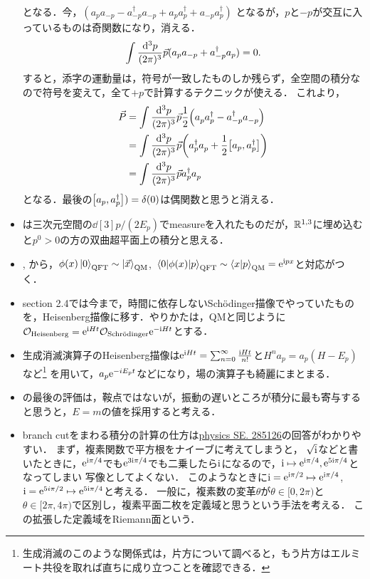 \begin{itemize}
		となる．今，$(a_pa_{-p}-a_{-p}^\dag a_{-p}+a_pa_p^{\dag}+a_{-p}a_{p}^\dag)$
		となるが，$p$と$-p$が交互に入っているものは奇関数になり，消える．		\begin{equation}
			\int \frac{\dd[3]{p}}{(2\pi)^{3}}\vec{p}(a_pa_{-p}+a_{-p}^{\dag}a_{p}) = 0.
		\end{equation}
		すると，添字の運動量は，符号が一致したものしか残らず，全空間の積分なので符号を変えて，全て$+p$で計算するテクニックが使える．
		これより，
		\begin{align}
			\vec{P} &= \int \frac{\dd[3]{p}}{(2\pi)^{3}}\vec{p}\frac{1}{2}\qty(a_p^{}a_p^{\dag}-a_{-p}^\dag a_{-p}^{})\\
					&= \int \frac{\dd[3]{p}}{(2\pi)^{3}}\vec{p}\qty(a_p^{\dag}a_{p}^{}+\frac{1}{2}\qty[a_{p}{}, a_{p}^{\dag}])\\
					&= \int \frac{\dd[3]{p}}{(2\pi)^{3}}\vec{p}a_p^\dag a_p^{}
		\end{align}
		となる．最後の$\qty[a_{p}{}, a_{p}^{\dag}])= \delta(0)$は偶関数と思うと消える．
	\item {}は三次元空間の$\dd[3]p/(2E_p)$でmeasureを入れたものだが，$\mathbb{R}^{1,3}$に埋め込むと$p^0>0$の方の双曲超平面上の積分と思える．
	\item {}, から，$\phi(x)\ket{0}_{\text{QFT}}\sim\ket{\vec{x}}_{\text{QM}}$, $\mel{0}{\phi(x)}{p}_{\text{QFT}}\sim\braket{x}{p}_{\text{QM}}=\mathrm{e}^{\mathrm{i} px}$と対応がつく．
	\item section 2.4では今まで，時間に依存しないSch\"{o}dinger描像でやっていたものを，Heisenberg描像に移す．やりかたは，QMと同じように$\mathcal{O}_{\text{Heisenberg}} = \mathrm{e}^{\mathrm{i} Ht}\mathcal{O}_{\text{Schr\"{o}dinger}}\mathrm{e}^{-\mathrm{i} Ht}$とする．
	\item 生成消滅演算子のHeisenberg描像は$\mathrm{e}^{\mathrm{i} Ht} = \sum_{n=0}^{\infty}\frac{\mathrm{i} Ht}{n!}$と$H^na_p=a_p(H-E_p)$など\footnote{生成消滅のこのような関係式は，片方について調べると，もう片方はエルミート共役を取れば直ちに成り立つことを確認できる．}
		を用いて，$a_p\mathrm{e}^{-iE_pt}$などになり，場の演算子も綺麗にまとまる．
	\item {}の最後の評価は，鞍点ではないが，振動の遅いところが積分に最も寄与すると思うと，$E=m$の値を採用すると考える．
	\item branch cutをまわる積分の計算の仕方は\href{https://physics.stackexchange.com/questions/285126/an-integral-in-peskins-quantum-field-theory-p-27}{physics SE. 285126}の回答がわかりやすい．
		まず，複素関数で平方根をナイーブに考えてしまうと，
		$\sqrt{\mathrm{i}}$などと書いたときに，$\mathrm{e}^{\mathrm{i}\pi/4}$でも$\mathrm{e}^{3\mathrm{i}\pi/4}$でも二乗したら$\mathrm{i}$になるので，$\mathrm{i}\mapsto\mathrm{e}^{\mathrm{i}\pi/4}, \mathrm{e}^{5\mathrm{i}\pi/4}$となってしまい
		写像としてよくない．
		このようなときに$\mathrm{i}=\mathrm{e}^{\mathrm{i}\pi/2}\mapsto\mathrm{e}^{\mathrm{i}\pi/4}$, $\mathrm{i}=\mathrm{e}^{5i\pi/2}\mapsto \mathrm{e}^{5\mathrm{i}\pi/4}$と考える．
		一般に，複素数の変革$\theta$が$\theta\in[0, 2\pi)$と$\theta\in[2\pi, 4\pi)$で区別し，複素平面二枚を定義域と思うという手法を考える．
		この拡張した定義域をRiemann面という．


\end{itemize}
